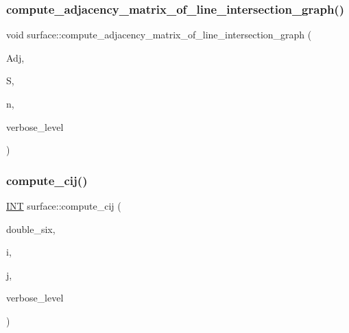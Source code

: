 \mbox{\label{classsurface_ac5787faa49029a5d56971271bb59f9f1}} 
\subsubsection{\texorpdfstring{compute\+\_\+adjacency\+\_\+matrix\+\_\+of\+\_\+line\+\_\+intersection\+\_\+graph()}{compute\_adjacency\_matrix\_of\_line\_intersection\_graph()}}
{\footnotesize\ttfamily void surface\+::compute\+\_\+adjacency\+\_\+matrix\+\_\+of\+\_\+line\+\_\+intersection\+\_\+graph (\begin{DoxyParamCaption}\item[{\mbox{\hyperlink{galois_8h_a09fddde158a3a20bd2dcadb609de11dc}{I\+NT}} $\ast$\&}]{Adj,  }\item[{\mbox{\hyperlink{galois_8h_a09fddde158a3a20bd2dcadb609de11dc}{I\+NT}} $\ast$}]{S,  }\item[{\mbox{\hyperlink{galois_8h_a09fddde158a3a20bd2dcadb609de11dc}{I\+NT}}}]{n,  }\item[{\mbox{\hyperlink{galois_8h_a09fddde158a3a20bd2dcadb609de11dc}{I\+NT}}}]{verbose\+\_\+level }\end{DoxyParamCaption})}

\mbox{\label{classsurface_af0252079b6ee1d7d1aa97514ab1f2650}} 
\subsubsection{\texorpdfstring{compute\+\_\+cij()}{compute\_cij()}}
{\footnotesize\ttfamily \mbox{\hyperlink{galois_8h_a09fddde158a3a20bd2dcadb609de11dc}{I\+NT}} surface\+::compute\+\_\+cij (\begin{DoxyParamCaption}\item[{\mbox{\hyperlink{galois_8h_a09fddde158a3a20bd2dcadb609de11dc}{I\+NT}} $\ast$}]{double\+\_\+six,  }\item[{\mbox{\hyperlink{galois_8h_a09fddde158a3a20bd2dcadb609de11dc}{I\+NT}}}]{i,  }\item[{\mbox{\hyperlink{galois_8h_a09fddde158a3a20bd2dcadb609de11dc}{I\+NT}}}]{j,  }\item[{\mbox{\hyperlink{galois_8h_a09fddde158a3a20bd2dcadb609de11dc}{I\+NT}}}]{verbose\+\_\+level }\end{DoxyParamCaption})}

